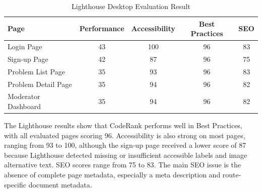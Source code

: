 \begin{table}[H]
\centering
\caption{Lighthouse Desktop Evaluation Result}
\label{tab:lighthouse-desktop-result}
\begin{tabular}{|l|c|c|c|c|}
\hline
\textbf{Page} & \textbf{Performance} & \textbf{Accessibility} & \textbf{Best Practices} & \textbf{SEO} \\
\hline
Login Page & 43 & 100 & 96 & 83 \\
\hline
Sign-up Page & 42 & 87 & 96 & 75 \\
\hline
Problem List Page & 35 & 93 & 96 & 83 \\
\hline
Problem Detail Page & 35 & 94 & 96 & 82 \\
\hline
Moderator Dashboard & 35 & 94 & 96 & 82 \\
\hline
\end{tabular}
\end{table}

The Lighthouse results show that CodeRank performs well in Best Practices, with all evaluated pages scoring 96. Accessibility is also strong on most pages, ranging from 93 to 100, although the sign-up page received a lower score of 87 because Lighthouse detected missing or insufficient accessible labels and image alternative text. SEO scores range from 75 to 83. The main SEO issue is the absence of complete page metadata, especially a meta description and route-specific document metadata.
